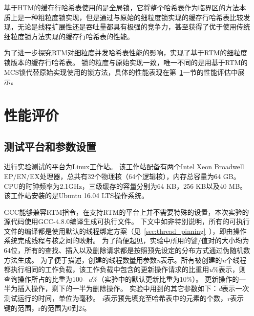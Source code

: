 基于HTM的缓存行哈希表使用的是全局锁，它将整个哈希表作为临界区的方法本质上是一种粗粒度锁实现，但是通过与原始的细粒度锁实现的缓存行哈希表比较发现，无论是线程扩展性还是吞吐量都具有极强的竞争力，甚至获得了优于使用传统细粒度锁方法实现的缓存行哈希表的性能。

为了进一步探究RTM对细粒度并发哈希表性能的影响，实现了基于RTM的细粒度锁版本的缓存行哈希表。
锁的粒度与原始实现一致，唯一不同的是用基于RTM的MCS锁代替原始实现使用的锁方法，具体的性能表现在第~\ref{sec:rtm-eva}一节的性能评估中展示。


\section{性能评价}
\label{sec:rtm-eva}
\subsection{测试平台和参数设置}
进行实验测试的平台为Linux工作站。
该工作站配备有两个Intel Xeon Broadwell EP/EN/EX处理器，总共有32个物理核（64个逻辑核），内存总容量为64 GB。
CPU的时钟频率为2.1GHz，三级缓存的容量分别为64 KB，256 KB以及40 MB。
该工作站安装的是Ubuntu 16.04 LTS操作系统。

GCC能够兼容RTM指令，在支持RTM的平台上并不需要特殊的设置，本次实验的源代码使用GCC-4.8.0编译生成可执行文件。
下文中如非特别说明，所有的可执行文件的编译都是使用默认的线程绑定方案（见~\ref{sec:thread_pinning}~），即由操作系统完成线程与核之间的映射。
为了简便起见，实验中所用的键/值对的大小均为64位，所有的查找、插入以及删除请求都是按照预先设定的分布方式通过伪随机数方法生成。
为了便于描述，创建的线程数量用参数\textit{n}表示。所有被创建的\textit{n}个线程都执行相同的工作负载，该工作负载中包含的更新操作请求的比重用\textit{u}\%表示，则查询操作所占的比重为100-~\textit{u}\%（实验中的默认更新比重为10\%）。
更新操作的一半为插入操作，剩下的一半为删除操作。
实验中用到的其它参数如下：\textit{d}表示一次测试运行的时间，单位为毫秒。
\textit{i}表示预先填充至哈希表中的元素的个数，\textit{r}表示键的范围，r的范围为0到2\textit{i}。

